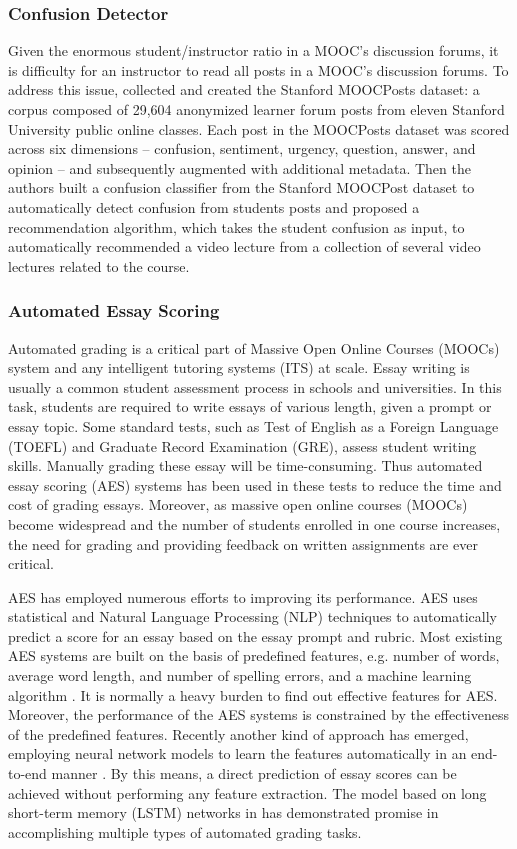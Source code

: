 \documentclass{article}
\begin{document}
\subsubsection{Confusion Detector}
Given the enormous student/instructor ratio in a MOOC's discussion
forums, it is difficulty for an instructor to read all posts in a
MOOC's discussion forums. To address this issue, \cite{Agrawal2015-hp}
collected and created the Stanford MOOCPosts dataset: a corpus
composed of 29,604 anonymized learner forum posts from eleven Stanford
University public online classes. Each post in the MOOCPosts dataset
was scored across six dimensions -- confusion, sentiment, urgency,
question, answer, and opinion -- and subsequently augmented with
additional metadata. Then the authors built a confusion classifier from
the Stanford MOOCPost dataset to automatically detect confusion from
students posts and proposed a recommendation algorithm, which takes the
student confusion as input, to automatically recommended a
video lecture from a collection of several video lectures related to
the course.
\subsubsection{Automated Essay Scoring}
Automated grading is a critical part of Massive Open Online Courses (MOOCs) system and any intelligent tutoring systems (ITS) at scale. Essay writing is usually a common student assessment process in schools and universities. In this task, students are required to write essays of various length, given a prompt or essay topic. Some standard tests, such as Test of English as a Foreign Language (TOEFL) and Graduate Record Examination (GRE), assess student writing skills. Manually grading these essay will be time-consuming. Thus automated essay scoring (AES) systems has been used in these tests to reduce the time and cost of grading essays. Moreover, as massive open online courses (MOOCs) become widespread and the number of students enrolled in one course increases, the need for grading and providing feedback on written assignments are ever critical.

AES has employed numerous efforts to improving its performance. AES uses statistical and Natural Language Processing (NLP) techniques to automatically predict a score for an essay based on the essay prompt and rubric. Most existing AES systems are built on the basis of predefined features, e.g. number of words, average word length, and number of spelling errors, and a machine learning algorithm \cite{Chen2013-zw}. It is normally a heavy burden to find out effective features for AES. Moreover, the performance of the AES systems is constrained by the effectiveness of the predefined features. Recently another kind of approach has emerged, employing neural network models to learn the features automatically in an end-to-end manner \cite{Taghipour2016-ns}. By this means, a direct prediction of essay scores can be achieved without performing any feature extraction. The model based on long short-term memory (LSTM) networks in \cite{Taghipour2016-ns} has demonstrated promise in accomplishing multiple types of automated grading tasks.
\end{document}
